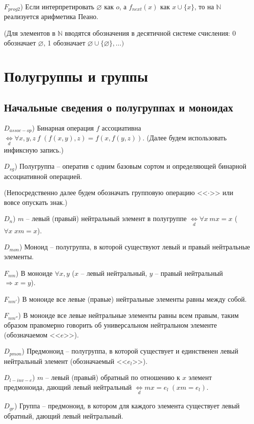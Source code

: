 \documentclass[a4paper]{article}
\newcommand{\Def}[0]{\underset{d}{\Leftrightarrow}}
\begin{document}
$F_{prog2}$) Если интерпретировать $\varnothing$ как $o$, а $f_{next}(x)$ как $x \cup \{x\}$, то на $\mathbb{N}$ реализуется арифметика Пеано.

(Для элементов в $\mathbb{N}$ вводятся обозначения в десятичной системе счисления: 0 обозначает $\varnothing$, 1 обозначает $\varnothing \cup \{\varnothing\}, \dots)$


\section{Полугруппы и группы}

\subsection{Начальные сведения о полугруппах и моноидах}

$D_{assoc-op}$) Бинарная операция $f$ ассоциативна $\Def \forall x, y, z~f \; (f(x, y), z) = f(x, f(y, z)).$ (Далее будем использовать инфиксную запись.)

$D_{sg}$) Полугруппа -- оператив с одним базовым сортом и определяющей бинарной ассоциативной операцией.

(Непосредственно далее будем обозначать групповую операцию <<$\cdot$>> или вовсе опускать знак.)

$D_n$) $m$ -- левый (правый) нейтральный элемент в полугруппе $\Def \forall x~mx = x$ ($\forall x \; xm = x$).

$D_{mon}$) Моноид -- полугруппа, в которой существуют левый и правый нейтральные элементы.

$F_{nm}$) В моноиде $\forall x, y$ ($x$ -- левый нейтральный, $y$ -- правый нейтральный $\Rightarrow x = y$).

$F_{nm'}$) В моноиде все левые (правые) нейтральные элементы равны между собой.

$F_{nm''}$) В моноиде все левые нейтральные элементы равны всем правым, таким образом правомерно говорить об универсальном нейтральном элементе (обозначаемом <<$e$>>).

$D_{pmon}$) Предмоноид -- полугруппа, в которой существует и единственен левый нейтральный элемент (обозначаемый <<$e_l$>>).

$D_{l-inv-e}$) $m$ -- левый (правый) обратный по отношению к $x$ элемент предмоноида, дающий левый нейтральный $\Def mx = e_l \; (xm = e_l).$

$D_{gr}$) Группа -- предмоноид, в котором для каждого элемента существует левый обратный, дающий левый нейтральный.
\end{document}
